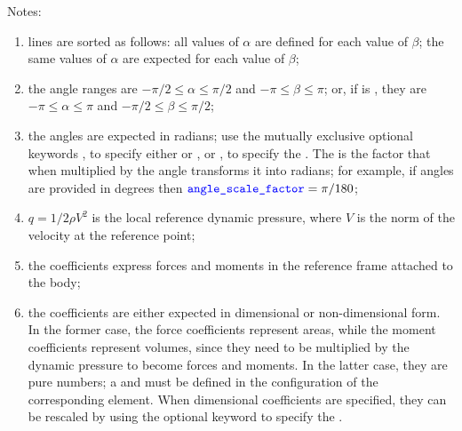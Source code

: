 Notes:
\begin{enumerate}
\item lines are sorted as follows:
all values of $\alpha$ are defined for each value of $\beta$;
the same values of $\alpha$ are expected for each value of $\beta$;
\item the angle ranges are $-\pi/2 \le \alpha \le \pi/2$ and
$-\pi \le \beta \le \pi$; or, if  is ,
they are $-\pi \le \alpha \le \pi$ and $-\pi/2 \le \beta \le \pi/2$;
\item the angles are expected in radians;
use the mutually exclusive optional keywords ,
to specify either  or ,
or , to specify the .
The  is the factor that when multiplied by the
angle transforms it into radians; for example, if angles are provided
in degrees then $\textcolor{blue}{\texttt{angle\_scale\_factor}} = \pi/180$;
\item $q=1/2 \rho V^2$ is the local reference dynamic pressure,
where $V$ is the norm of the velocity at the reference point;
\item the coefficients express forces and moments in the reference frame
attached to the body;
\item the coefficients are either expected in dimensional
or non-dimensional form.
In the former case, the force coefficients represent areas,
while the moment coefficients represent volumes, since they need
to be multiplied by the dynamic pressure to become forces and moments.
In the latter case, they are pure numbers; a 
and  must be defined in the configuration
of the corresponding  element.
When dimensional coefficients are specified, they can be rescaled
by using the optional keyword  to specify
the .
\end{enumerate}

